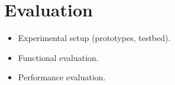 \section{Evaluation} 
\label{sec:evaluation}



\begin{itemize}
    \item Experimental setup (prototypes, testbed).
    \item Functional evaluation.
    \item Performance evaluation.
\end{itemize}

\blindtext[8]

\newpage